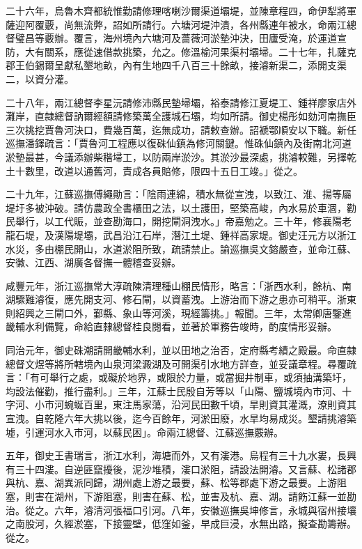 \begin{pinyinscope}
二十六年，烏魯木齊都統惟勤請修理喀喇沙爾渠道壩堤，並陳章程四，命伊犁將軍薩迎阿覆覈，尚無流弊，詔如所請行。六塘河堤沖潰，各州縣連年被水，命兩江總督璧昌等覈辦。覆言，海州境內六塘河及薔薇河淤墊沖決，田廬受淹，於運道宣防，大有關系，應從速借款挑築，允之。修溫榆河果渠村壩埽。二十七年，扎薩克郡王伯錫爾呈獻私墾地畝，內有生地四千八百三十餘畝，接濬新渠二，添開支渠二，以資分灌。

二十八年，兩江總督李星沅請修沛縣民墊埽壩，裕泰請修江夏堤工、鍾祥廖家店外灘岸，直隸總督訥爾經額請修築萬全護城石壩，均如所請。御史楊彤如劾河南撫臣三次挑挖賈魯河決口，費幾百萬，迄無成功，請敕查辦。詔褫鄂順安以下職。新任巡撫潘鐸疏言：「賈魯河工程應以復硃仙鎮為修河關鍵。惟硃仙鎮內及街南北河道淤墊最甚，今議添辦柴稭埽工，以防兩岸淤沙。其淤沙最深處，挑濬較難，另擇乾土十數里，改道以通舊河，責成各員賠修，限四十五日工竣。」從之。

二十九年，江蘇巡撫傅繩勛言：「陰雨連綿，積水無從宣洩，以致江、淮、揚等屬堤圩多被沖破。請仿農政全書櫃田之法，以土護田，堅築高峻，內水易於車涸，勸民舉行，以工代賑，並查勘海口，開挖閘洞洩水。」帝嘉勉之。三十年，修襄陽老龍石堤，及漢陽堤壩，武昌沿江石岸，潛江土堤、鍾祥高家堤。御史汪元方以浙江水災，多由棚民開山，水道淤阻所致，疏請禁止。諭巡撫吳文鎔嚴查，並命江蘇、安徽、江西、湖廣各督撫一體稽查妥辦。

咸豐元年，浙江巡撫常大淳疏陳清理種山棚民情形，略言：「浙西水利，餘杭、南湖驟難濬復，應先開支河、修石閘，以資蓄洩。上游治而下游之患亦可稍平。浙東則紹興之三閘口外，鄞縣、象山等河溪，現經籌挑。」報聞。三年，太常卿唐鑒進畿輔水利備覽，命給直隸總督桂良閱看，並著於軍務告竣時，酌度情形妥辦。

同治元年，御史硃潮請開畿輔水利，並以田地之治否，定府縣考績之殿最。命直隸總督文煜等將所轄境內山泉河梁澱湖及可開渠引水地方詳查，並妥議章程。尋覆疏言：「有可舉行之處，或礙於地界，或限於力量，或當掘井制車，或須抽溝築圩，均設法催勸，推行盡利。」三年，江蘇士民殷自芳等以「山陽、鹽城境內市河、十字河、小市河蜿蜒百里，東注馬家蕩，沿河民田數千頃，旱則資其灌溉，潦則資其宣洩。自乾隆六年大挑以後，迄今百餘年，河淤田廢，水旱均易成災。墾請挑濬築墟，引運河水入市河，以蘇民困」。命兩江總督、江蘇巡撫覈辦。

五年，御史王書瑞言，浙江水利，海塘而外，又有漊港。烏程有三十九水婁，長興有三十四漊。自逆匪竄擾後，泥沙堆積，漊口淤阻，請設法開濬。又言蘇、松諸郡與杭、嘉、湖異派同歸，湖州處上游之最要，蘇、松等郡處下游之最要。上游阻塞，則害在湖州，下游阻塞，則害在蘇、松，並害及杭、嘉、湖。請飭江蘇一並勘治。從之。六年，濬清河張福口引河。八年，安徽巡撫吳坤修言，永城與宿州接壤之南股河，久經淤塞，下接靈壁，低窪如釜，早成巨浸，水無出路，擬查勘籌辦。從之。


\end{pinyinscope}
